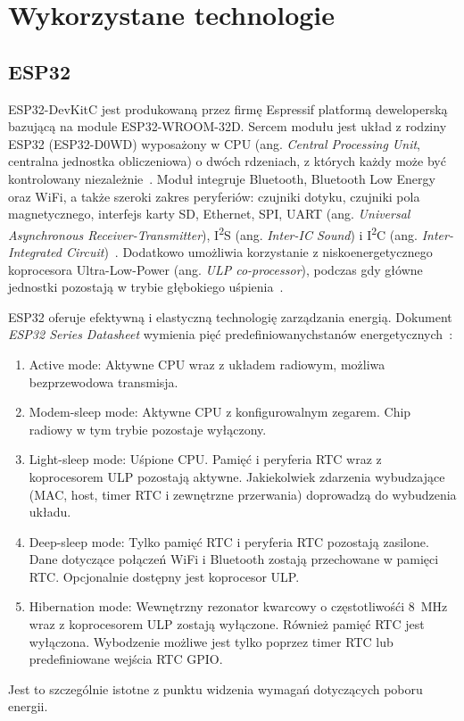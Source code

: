     \section {Wykorzystane technologie}

        \subsection{ESP32}

            ESP32-DevKitC jest produkowaną przez firmę Espressif platformą deweloperską bazującą na module ESP32-WROOM-32D. Sercem modułu jest układ z rodziny ESP32 (ESP32-D0WD) wyposażony w CPU (ang. \textit{Central Processing Unit}, centralna jednostka obliczeniowa) o dwóch rdzeniach, z których każdy może być kontrolowany niezależnie~\cite{esp32-wroom32-ds}. Moduł integruje Bluetooth, Bluetooth Low Energy oraz WiFi, a także szeroki zakres peryferiów: czujniki dotyku, czujniki pola magnetycznego, interfejs karty SD, Ethernet, SPI, UART (ang. \textit{Universal Asynchronous Receiver-Transmitter}), I\textsuperscript{2}S (ang. \textit{Inter-IC Sound}) i I\textsuperscript{2}C (ang. \textit{Inter-Integrated Circuit})~\cite{esp32-wroom32-ds}. Dodatkowo umożliwia korzystanie z niskoenergetycznego koprocesora Ultra-Low-Power (ang. \textit{ULP co-processor}), podczas gdy główne jednostki pozostają w trybie głębokiego uśpienia~\cite{esp32-tech-ref-man}.

            ESP32 oferuje efektywną i elastyczną technologię zarządzania energią. Dokument \textit{ESP32 Series Datasheet} wymienia pięć predefiniowanychstanów energetycznych~\cite{esp32-ds}:
            \begin{enumerate}
                \item Active mode: Aktywne CPU wraz z układem radiowym, możliwa bezprzewodowa transmisja.
                \item Modem-sleep mode: Aktywne CPU z konfigurowalnym zegarem. Chip radiowy w tym trybie pozostaje wyłączony.
                \item Light-sleep mode: Uśpione CPU. Pamięć i peryferia RTC wraz z koprocesorem ULP pozostają aktywne. Jakiekolwiek zdarzenia wybudzające (MAC, host, timer RTC i zewnętrzne przerwania) doprowadzą do wybudzenia układu.
                \item Deep-sleep mode: Tylko pamięć RTC i peryferia RTC pozostają zasilone. Dane dotyczące połączeń WiFi i Bluetooth zostają przechowane w pamięci RTC. Opcjonalnie dostępny jest koprocesor ULP.
                \item Hibernation mode: Wewnętrzny rezonator kwarcowy o częstotliwośći 8~MHz wraz z koprocesorem ULP zostają wyłączone. Również pamięć RTC jest wyłączona. Wybodzenie możliwe jest tylko poprzez timer RTC lub predefiniowane wejścia RTC GPIO.
            \end{enumerate}
            Jest to szczególnie istotne z punktu widzenia wymagań dotyczących poboru energii.

